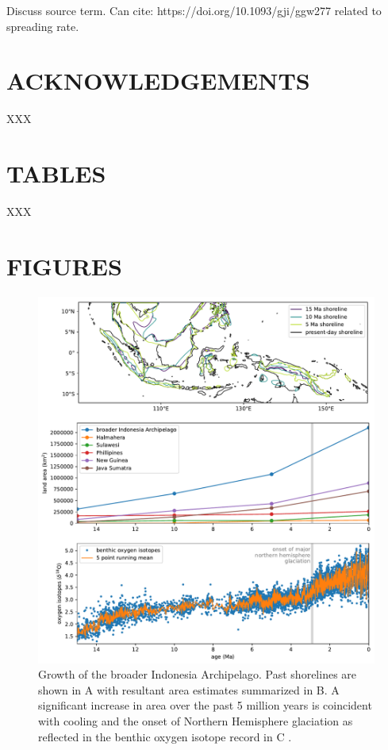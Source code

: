 \documentclass[11pt,letterpaper]{article}
\begin{document}
Discuss source term. Can cite: https://doi.org/10.1093/gji/ggw277 related to spreading rate.

\section*{ACKNOWLEDGEMENTS \label{sec:ACKNOWLEDGEMENTS}}

XXX

\clearpage
\newpage

\section*{TABLES}

XXX

\clearpage
\newpage

\section*{FIGURES}

\begin{figure}
    \centering
    \includegraphics[width=1\textwidth]{Manuscript/Figures/shoreline_growth.pdf}
    \caption{Growth of the broader Indonesia Archipelago. Past shorelines are shown in A with resultant area estimates summarized in B. A significant increase in area over the past 5 million years is coincident with cooling and the onset of Northern Hemisphere glaciation as reflected in the benthic oxygen isotope record in C \cite{Zachos2008a}.}
    \label{fig:shoreline_growth}
\end{figure}
\end{document}
